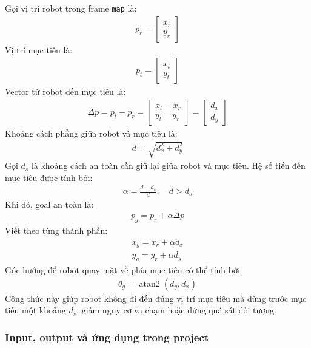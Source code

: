 Gọi vị trí robot trong frame \texttt{map} là:
\begin{gather*}p_{r} = \begin{bmatrix}
x_{r} \\
y_{r}
\end{bmatrix}\end{gather*}
Vị trí mục tiêu là:
\begin{gather*}p_{t} = \begin{bmatrix}
x_{t} \\
y_{t}
\end{bmatrix}\end{gather*}
Vector từ robot đến mục tiêu là:
\begin{gather*}\Delta p = p_{t} - p_{r} = \begin{bmatrix}
x_{t} - x_{r} \\
y_{t} - y_{r}
\end{bmatrix} = \begin{bmatrix}
d_{x} \\
d_{y}
\end{bmatrix}\end{gather*}
Khoảng cách phẳng giữa robot và mục tiêu là:
\begin{gather*}d = \sqrt{d_{x}^{2} + d_{y}^{2}}\end{gather*}
Gọi \(d_{s}\) là khoảng cách an toàn cần giữ lại giữa robot và mục tiêu.
Hệ số tiến đến mục tiêu được tính bởi:
\begin{gather*}\alpha = \frac{d - d_{s}}{d},\quad d > d_{s}\end{gather*}
Khi đó, goal an toàn là:
\begin{gather*}p_{g} = p_{r} + \alpha\Delta p\end{gather*}
Viết theo từng thành phần:
\begin{gather*}x_{g} = x_{r} + \alpha d_{x} \\[1.5ex]
y_{g} = y_{r} + \alpha d_{y}\end{gather*}
Góc hướng để robot quay mặt về phía mục tiêu có thể tính bởi:
\begin{gather*}\theta_{g} = \operatorname{atan2}\left( d_{y},d_{x} \right)\end{gather*}
Công thức này giúp robot không đi đến đúng vị trí mục tiêu mà dừng trước
mục tiêu một khoảng \(d_{s}\), giảm nguy cơ va chạm hoặc đứng quá sát
đối tượng.

\subsubsection{Input, output và ứng dụng trong project}

